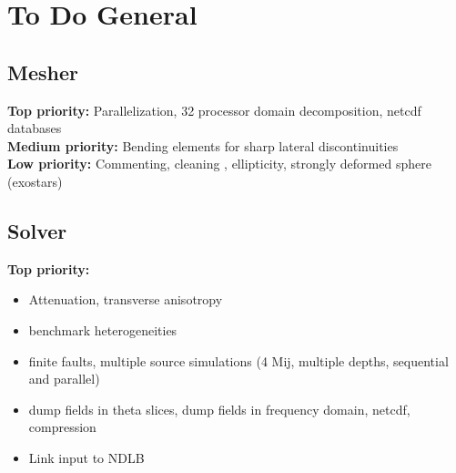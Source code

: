 \documentclass[11pt,letter,fleqn,english,notitlepage]{article}
\begin{document}
\newpage
\section{To Do General}
\subsection{Mesher}
\textbf{Top priority:} Parallelization, 32 processor domain decomposition, netcdf databases\\

\noindent\textbf{Medium priority:} Bending elements for sharp lateral
discontinuities\\

\noindent\textbf{Low priority:} Commenting, cleaning , ellipticity, strongly deformed sphere
(exostars)

\subsection{Solver}
\noindent\textbf{Top priority:} 
\begin{itemize}
\item Attenuation, transverse anisotropy
\item benchmark heterogeneities
\item finite faults, multiple source simulations (4 Mij,
multiple depths, sequential and parallel)
\item dump fields in theta slices, dump fields in frequency domain,
  netcdf, compression
\item Link input to NDLB
\end{itemize}
\end{document}
